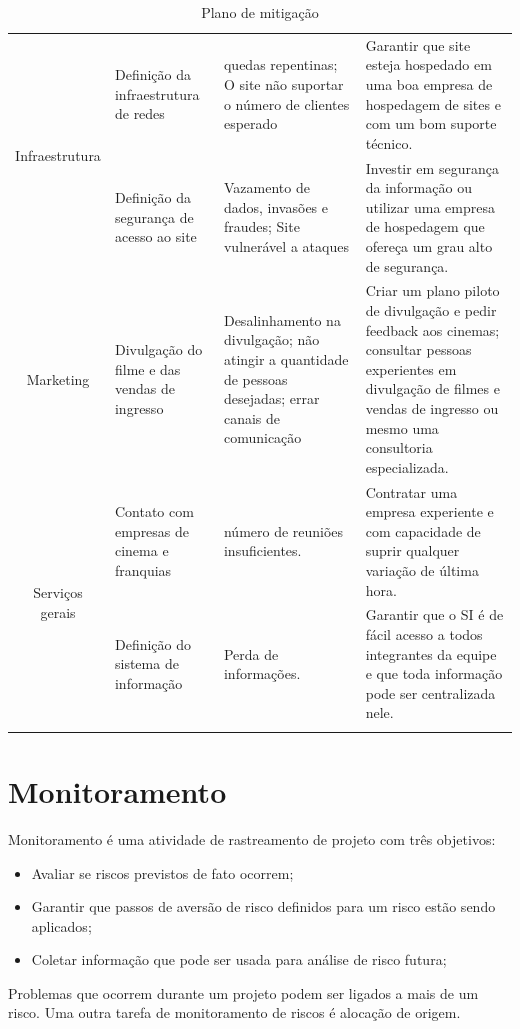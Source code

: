 \documentclass[12pt]{article}
\begin{document}
\begin{center}
\begin{longtable}{|c|p{2.5cm}|p{4cm}|p{4cm}|}
            \multirow{2}{*}{Infraestrutura} & Definição da infraestrutura de redes & quedas repentinas; O site não suportar o número de clientes esperado & Garantir que site esteja hospedado em uma boa empresa de hospedagem de sites e com um bom suporte técnico. \\ \cline{2-4} 
                     
            & Definição da segurança de acesso ao site & Vazamento de dados, invasões e fraudes; Site vulnerável a ataques & Investir em segurança da informação ou utilizar uma empresa de hospedagem que ofereça um grau alto de segurança.\\ \hline
            
            Marketing & Divulgação do filme e das vendas de ingresso & Desalinhamento na divulgação; não atingir a quantidade de pessoas desejadas; errar canais de comunicação & Criar um plano piloto de divulgação e pedir feedback aos cinemas; consultar pessoas experientes em divulgação de filmes e vendas de ingresso ou mesmo uma consultoria especializada.\\ \hline
            
            \multirow{2}{*}{Serviços gerais}& Contato com empresas de cinema e franquias & número de reuniões insuficientes. & Contratar uma empresa experiente e com capacidade de suprir qualquer variação de última hora. \\ \cline{2-4}
            
            & Definição do sistema de informação & Perda de informações. & Garantir que o SI é de fácil acesso a todos integrantes da equipe e que toda informação pode ser centralizada nele.\\ \hline
         
            \caption{Plano de mitigação}
            \label{table:Mitigacao}
        \end{longtable}
    \end{center}

        
        
    \section{Monitoramento}
            Monitoramento é uma atividade de rastreamento de projeto com três objetivos:
             \begin{itemize}
               \item Avaliar se riscos previstos de fato ocorrem;
               \item Garantir que passos de aversão de risco definidos para um risco estão sendo aplicados;
                \item Coletar informação que pode ser usada para análise de risco futura;
             \end{itemize}
        Problemas que ocorrem durante um projeto podem ser ligados a mais de um risco. Uma outra tarefa de monitoramento de riscos é alocação de origem.
\end{document}
